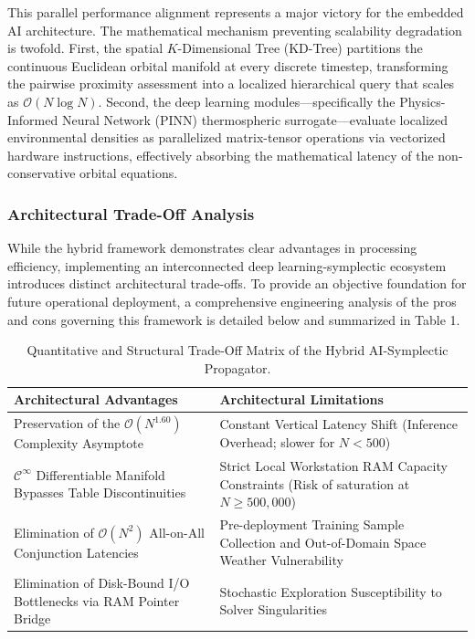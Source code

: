 \documentclass[letterpaper, preprint, 11pt]{AAS}
\begin{document}
This parallel performance alignment represents a major victory for the embedded AI architecture. The mathematical mechanism preventing scalability degradation is twofold. First, the spatial $K$-Dimensional Tree (KD-Tree) partitions the continuous Euclidean orbital manifold at every discrete timestep, transforming the pairwise proximity assessment into a localized hierarchical query that scales as $\mathcal{O}(N \log N)$. Second, the deep learning modules—specifically the Physics-Informed Neural Network (PINN) thermospheric surrogate—evaluate localized environmental densities as parallelized matrix-tensor operations via vectorized hardware instructions, effectively absorbing the mathematical latency of the non-conservative orbital equations.

\subsubsection{Architectural Trade-Off Analysis}
While the hybrid framework demonstrates clear advantages in processing efficiency, implementing an interconnected deep learning-symplectic ecosystem introduces distinct architectural trade-offs. To provide an objective foundation for future operational deployment, a comprehensive engineering analysis of the pros and cons governing this framework is detailed below and summarized in Table 1.

\begin{table}[hbt!]
    \centering
    \caption{Quantitative and Structural Trade-Off Matrix of the Hybrid AI-Symplectic Propagator.}
    \label{tab:pros_cons_tradeoffs}
    \begin{tabular}{p{} p{}}
        \toprule
        \textbf{Architectural Advantages} & \textbf{Architectural Limitations} \\
        \midrule
        Preservation of the $\mathcal{O}(N^{1.60})$ Complexity Asymptote & Constant Vertical Latency Shift (Inference Overhead; slower for $N < 500$) \\ \addlinespace
        $\mathcal{C}^\infty$ Differentiable Manifold Bypasses Table Discontinuities & Strict Local Workstation RAM Capacity Constraints (Risk of saturation at $N \ge 500,000$) \\ \addlinespace
        Elimination of $\mathcal{O}(N^2)$ All-on-All Conjunction Latencies & Pre-deployment Training Sample Collection and Out-of-Domain Space Weather Vulnerability \\ \addlinespace
        Elimination of Disk-Bound I/O Bottlenecks via RAM Pointer Bridge & Stochastic Exploration Susceptibility to Solver Singularities \\
        \bottomrule
    \end{tabular}
\end{table}
\end{document}
